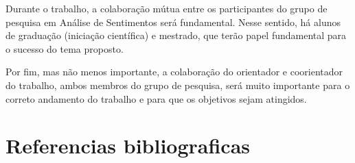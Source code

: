 \documentclass[a4paper,11pt]{article}
\begin{document}
Durante o trabalho, a colaboração mútua entre os participantes do grupo de pesquisa em Análise de Sentimentos será fundamental. Nesse sentido, há alunos de graduação (iniciação científica) e mestrado, que terão papel fundamental para o sucesso do tema proposto.

Por fim, mas não menos importante, a colaboração do orientador e coorientador do trabalho, ambos membros do grupo de pesquisa, será muito importante para o correto andamento do trabalho e para que os objetivos sejam atingidos.
\section{Referencias bibliograficas}


\end{document}
